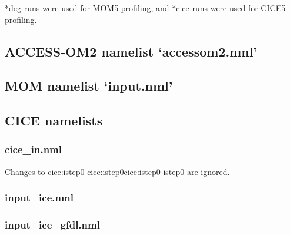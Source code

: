\documentclass[11pt]{article}
\makeatletter
\newcommand*{\make@hex@label}[1]{%
  \def\hex@label{#1}%
  \@onelevel@sanitize\hex@label
  \EdefEscapeHex\hex@label{\hex@label}%
}
\newcommand*{\hexhyperlink}[2]{%
  \make@hex@label{#1}%
  \hyperlink{\hex@label}{#2}%
}
\newcommand{\cicelink}[2]{\hexhyperlink{cice:#2}{#1}}
\newcommand{\paramsty}[1]{\textsf{#1}}
\newcommand{\cice}[1]{\paramsty{\cicelink{#1}{#1}}\index{\paramsty{#1}}}
\newcommand{\nmldiffer}[1]{#1} %
\newcommand{\nmllink}[2]{#1\index{\paramsty{#1}}} %
\newcommand{\nml}[1]{{\footnotesize\textsf{}}}
\makeatother
\begin{document}
*deg runs were used for MOM5 profiling, and *cice runs were used for CICE5 profiling.
\renewcommand{\nmldiffer}[1]{#1} %

\subsection{ACCESS-OM2 namelist `accessom2.nml'}\label{S:accessom2-namelist-prof-diff}
\renewcommand{\nmllink}[2]{\href{https://github.com/OceansAus/libaccessom2/search?q=#2}{#1}\index{\paramsty{#1}}} %
\nml{accessom2_nml_1deg_prof_diff.tex}
\nml{accessom2_nml_025deg_prof_diff.tex}
\nml{accessom2_nml_01deg_prof_diff.tex}

\subsection{MOM namelist `input.nml'}\label{S:mom-namelist-prof-diff}
\renewcommand{\nmllink}[2]{\href{https://github.com/mom-ocean/MOM5/search?q=#2}{#1}\index{\paramsty{#1}}} %
\nml{input_nml_1deg_prof_diff.tex}
\nml{input_nml_025deg_prof_diff.tex}
\nml{input_nml_01deg_prof_diff.tex}

\subsection{CICE namelists}\label{S:cice-namelist-prof-diff}
\renewcommand{\nmllink}[2]{\href{https://github.com/OceansAus/cice5/search?q=#2}{#1}\index{\paramsty{#1}}} %
\subsubsection{cice\_in.nml}
Changes to \cice{istep0} are ignored. 
\nml{cice_in_nml_1deg_prof_diff.tex}
\nml{cice_in_nml_025deg_prof_diff.tex}
\nml{cice_in_nml_01deg_prof_diff.tex}
\subsubsection{input\_ice.nml}
\nml{input_ice_nml_1deg_prof_diff.tex}
\nml{input_ice_nml_025deg_prof_diff.tex}
\nml{input_ice_nml_01deg_prof_diff.tex}
\subsubsection{input\_ice\_gfdl.nml}
\nml{input_ice_gfdl_nml_1deg_prof_diff.tex}
\nml{input_ice_gfdl_nml_025deg_prof_diff.tex}
\nml{input_ice_gfdl_nml_01deg_prof_diff.tex}
\end{document}

